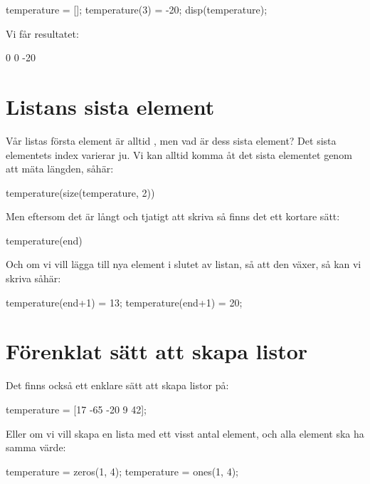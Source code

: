 \begin{matlab}[caption={Listan fylls automatiskt på med tomma element},label={}]
temperature = [];
temperature(3) = -20;
disp(temperature);
\end{matlab}

Vi får resultatet:

\vspace{10pt}
\begin{matlab}
	0    0  -20
\end{matlab}

\section{Listans sista element}

Vår listas första element är alltid , men vad är dess sista element? Det sista elementets index varierar ju. Vi kan alltid komma åt det sista elementet genom att mäta längden, såhär:
\vspace{10pt}
\begin{matlab}
temperature(size(temperature, 2))
\end{matlab}
Men eftersom det är långt och tjatigt att skriva så finns det ett kortare sätt:
\vspace{10pt}
\begin{matlab}
temperature(end)
\end{matlab}
Och om vi vill lägga till nya element i slutet av listan, så att den växer, så kan vi skriva såhär:
\vspace{10pt}
\begin{matlab}
temperature(end+1) = 13;
temperature(end+1) = 20;
\end{matlab}
\newpage
\section{Förenklat sätt att skapa listor}
Det finns också ett enklare sätt att skapa listor på:

\begin{matlab}[caption={Förenklat sätt att skapa listor},label={}]
temperature = [17 -65 -20 9 42];
\end{matlab}

Eller om vi vill skapa en lista med ett visst antal element, och alla element ska ha samma värde:

\begin{matlab}[caption={Massproduktion},label={}]
temperature = zeros(1, 4); %
temperature = ones(1, 4); %
\end{matlab}

